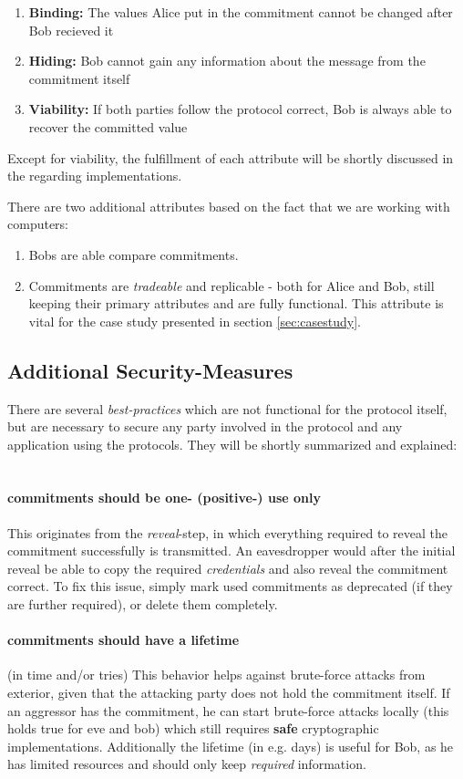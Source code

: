 \begin{enumerate}
	\item \textbf{Binding:} The values Alice put in the commitment cannot be changed after Bob recieved it 
	\item \textbf{Hiding:} Bob cannot gain any information about the message from the commitment itself
	\item \textbf{Viability:} If both parties follow the protocol correct, Bob is always able to recover the committed value
\end{enumerate}
Except for viability, the fulfillment of each attribute will be shortly discussed in the regarding implementations. 

There are two additional attributes based on the fact that we are working with computers:
\begin{enumerate}
	\item Bobs are able compare commitments.
	\item Commitments are \textit{tradeable} and replicable - both for Alice and Bob, still keeping their primary attributes and are fully functional. This attribute is vital for the case study presented in section \ref{sec:casestudy}.
\end{enumerate}

\subsection{Additional Security-Measures}
There are several \textit{best-practices} which are not functional for the protocol itself, but are necessary to secure any party involved in the protocol and any application using the protocols. They will be shortly summarized and explained: ~\newline

	\paragraph{commitments should be one- (positive-) use only} This originates from the \textit{reveal}-step, in which everything required to reveal the commitment successfully is transmitted. An eavesdropper would after the initial reveal be able to copy the required \textit{credentials} and also reveal the commitment correct.  To fix this issue, simply mark used commitments as deprecated (if they are further required), or delete them completely. 
	\paragraph{commitments should have a lifetime} (in time and/or tries)
	This behavior helps against brute-force attacks from exterior, given that the attacking party does not hold the commitment itself. If an aggressor has the commitment, he can start brute-force attacks locally (this holds true for eve and bob) which still requires \textbf{safe} cryptographic implementations.
	Additionally the lifetime (in e.g. days) is useful for Bob, as he has limited resources and should only keep \textit{required} information. 
